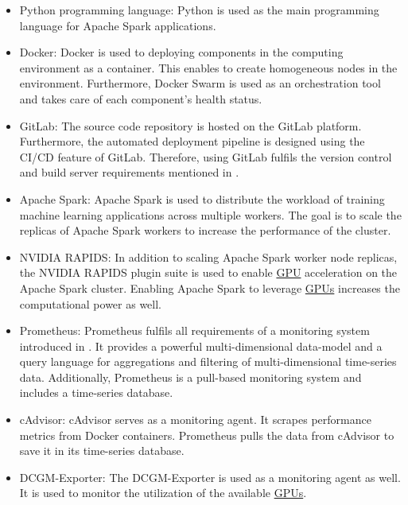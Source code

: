 \begin{itemize}
\item Python programming language: Python is used as the main programming language for Apache Spark applications.

\item Docker: Docker is used to deploying components in the computing environment as a container. This enables to create homogeneous nodes in the environment. Furthermore, Docker Swarm is used as an orchestration tool and takes care of each component's health status.

\item GitLab: The source code repository is hosted on the GitLab platform. Furthermore, the automated deployment pipeline is designed using the CI/CD feature of GitLab. Therefore, using GitLab fulfils the version control and build server requirements mentioned in .

\item Apache Spark: Apache Spark is used to distribute the workload of training machine learning applications across multiple workers. The goal is to scale the replicas of Apache Spark workers to increase the performance of the cluster.

\item NVIDIA RAPIDS: In addition to scaling Apache Spark worker node replicas, the NVIDIA RAPIDS plugin suite is used to enable \hyperlink{abbr:gpu}{GPU} acceleration on the Apache Spark cluster. Enabling Apache Spark to leverage \hyperlink{abbr:gpu}{GPUs} increases the computational power as well.

\item Prometheus: 
Prometheus fulfils all requirements of a monitoring system introduced in . It provides a powerful multi-dimensional data-model and a query language for aggregations and filtering of multi-dimensional time-series data. Additionally, Prometheus is a pull-based monitoring system and includes a time-series database.

\item cAdvisor:
cAdvisor serves as a monitoring agent. It scrapes performance metrics from Docker containers. Prometheus pulls the data from cAdvisor to save it in its time-series database.

\item DCGM-Exporter:
The DCGM-Exporter is used as a monitoring agent as well. It is used to monitor the utilization of the available \hyperlink{abbr:gpu}{GPUs}.
\end{itemize}


